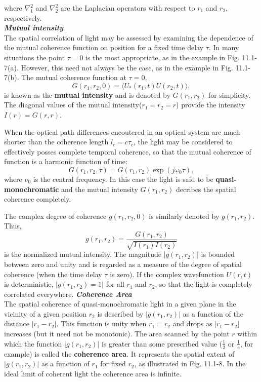 \documentclass{article}
\newcommand\crule[3][black]{\textcolor{#1}{\rule{#2}{#3}}}
\numberwithin{figure}{subsection}
\numberwithin{table}{subsection}
\begin{document}
where $ \nabla_1^2 $ and $ \nabla_2^2 $ are the Laplacian operators with respect to $ r_1 $ and $ r_2 $, respectively.\\
\noindent{\crule[ksc]{\textwidth}{0.2cm}}
\bigbreak\noindent\textcolor{ksc}{\textbf{\textsl{Mutual intensity}}}\\
The spatial correlation of light may be assessed by examining the dependence of the mutual coherence function on position for a fixed time delay $ \tau $. In many situations the point $ \tau = 0 $ is the most appropriate, as in the example in Fig. 11.1-7(a). However, this need not always be the case, as in the example in Fig. 11.1-7(b). The mutual coherence function at $ \tau = 0 $,
\begin{equation}
G(r_1, r_2, 0) = \langle U_\ast (r_1, t) U(r_2, t) \rangle ,
\end{equation}
is known as the \textbf{mutual intensity} and is denoted by $ G(r_1, r_2) $ for simplicity. The diagonal values of the mutual intensity($ r_1 = r_2 = r $) provide the intensity $ I(r) = G(r,r) $.
\par When the optical path differences encoutered in an optical system are much shorter than the coherence length $ l_c = c\tau_c $, the light may be considered to effectively posses complete temporal coherence, so that the mutual coherence of function is a harmonic function of time:
\begin{equation}
G(r_1, r_2, \tau) = G(r_1, r_2) \exp(j\omega_0 \tau),
\end{equation}
where $ \nu_0 $ is the central frequency. In this case the light is said to be \textbf{quasi-monochromatic} and the mutual intensity $ G(r_1, r_2) $ decribes the spatial coherence completely.
\par The complex degree of coherence $ g(r_1, r_2, 0) $ is similarly denoted by $ g(r_1, r_2) $. Thus,
\begin{equation}
g(r_1, r_2) = \frac{G(r_1, r_2)}{\sqrt{I(r_1) I(r_2)}}
\end{equation}
is the normalized mutual intensity. The magnitude $ \lvert g(r_1, r_2) \rvert $ is bounded between zero and unity and is regarded as a measure of the degree of spatial coherence (when the time delay $ \tau $ is zero). If the complex wavefunction $ U(r, t) $ is deterministic, $ \lvert g(r_1, r_2) = 1 \rvert$ for all $ r_1 $ and $ r_2 $, so that the light is completely correlated everywhere.
\bigbreak\noindent\textcolor{ksc}{\textbf{\textsl{Coherence Area}}}\\
The spatial coherence of quasi-monochromatic light in a given plane in the vicinity of a given position $ r_2 $ is described by $ \lvert g(r_1, r_2) \rvert $ as a function of the distance $ \lvert r_1 - r_2 \rvert $. This function is unity when $ r_1 = r_2 $ and drops as $ \lvert r_1 - r_2 \rvert $ increases (but it need not be monotonic). The area scanned by the point $ r $ within which the function $ \lvert g(r_1, r_2) \rvert $ is greater than some prescribed value ($ \frac{1}{2} $ or $ \frac{1}{e} $, for example) is called the \textbf{coherence area}. It represents the spatial extent of $ \lvert g(r_1, r_2) \rvert $ as a function of $ r_1 $ for fixed $ r_2 $, as illustrated in Fig. 11.1-8. In the ideal limit of coherent light the coherence area is infinite.
\end{document}
